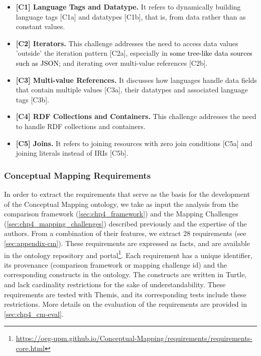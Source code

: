 \begin{itemize}
    \item \textbf{[C1] Language Tags and Datatype.} It refers to dynamically building language tags [C1a] and datatypes [C1b], that is, from data rather than as constant values.
    \item \textbf{[C2] Iterators.} This challenge addresses the need to access data values 'outside' the iteration pattern [C2a], especially in \textcolor{black}{some tree-like data sources such as JSON}; and iterating over multi-value references [C2b].
    \item \textbf{[C3] Multi-value References.} It discusses how languages  handle data fields that contain multiple values [C3a], their datatypes and associated language tags [C3b].
    \item \textbf{[C4] RDF Collections and Containers.} This challenge addresses the need to handle RDF collections and containers.
    \item \textbf{[C5] Joins.} It refers to joining resources with zero join conditions [C5a] and joining literals instead of IRIs [C5b].
\end{itemize} 


\subsubsection{Conceptual Mapping Requirements}
\label{sec:chp4_cm-reqs}

In order to extract the requirements that serve as the basis for the development of the Conceptual Mapping ontology, we take as input the analysis from the comparison framework (\cref{sec:chp4_framework}) and the Mapping Challenges (\cref{sec:chp4_mapping_challenges}) described previously and the expertise of the authors. From a combination of their features, we extract 28 requirements (see \cref{sec:appendix-cm}). These requirements are expressed as facts, and are available in the ontology repository and portal\footnote{\url{https://oeg-upm.github.io/Conceptual-Mapping/requirements/requirements-core.html}}. Each requirement has a unique identifier, its provenance (comparison framework or mapping challenge id) and the corresponding constructs in the ontology. The constructs are written in Turtle, and lack cardinality restrictions for the sake of understandability. These requirements are tested with Themis, and its corresponding tests include these restrictions. More details on the evaluation of the requirements are provided in \cref{sec:chp4_cm-eval}. 

